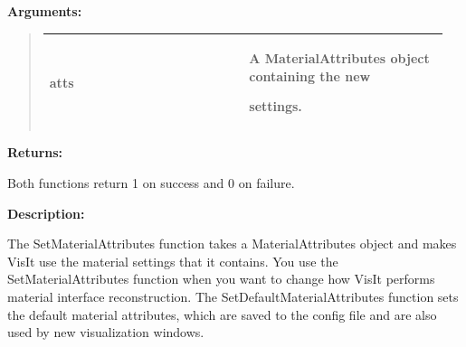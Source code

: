 \documentclass[letterpaper,10pt,english]{sphinxmanual}
\begin{document}
\begin{DUlineblock}{0em}
\item[] 
\item[] \textbf{Arguments:}
\end{DUlineblock}
\begin{quote}

\begin{tabular}{|p{0.475\linewidth}|p{0.475\linewidth}|}
\hline

atts
 & 
\begin{DUlineblock}{0em}
\item[] A MaterialAttributes object containing the new
\item[] settings.
\end{DUlineblock}
\\
\hline\end{tabular}

\end{quote}

\begin{DUlineblock}{0em}
\item[] 
\item[] \textbf{Returns:}
\item[] Both functions return 1 on success and 0 on failure.
\item[] 
\item[] \textbf{Description:}
\item[] The SetMaterialAttributes function takes a MaterialAttributes object and
makes VisIt use the material settings that it contains. You use the
SetMaterialAttributes function when you want to change how VisIt performs
material interface reconstruction. The SetDefaultMaterialAttributes
function sets the default material attributes, which are saved to the
config file and are also used by new visualization windows.
\end{DUlineblock}

\begin{DUlineblock}{0em}
\item[] 
\end{DUlineblock}
\end{document}
